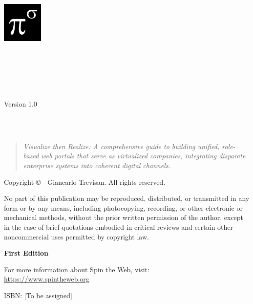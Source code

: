 \begin{titlepage}
\centering

\includegraphics[width=0.15\textwidth]{figures/logo.png}\\[1cm]

\vspace*{1cm}

\makeatletter
{\Huge\bfseries \@title\\[0.5cm]}

\ifx\@subtitle\@empty\else
{\Large \@subtitle\\[1.5cm]}
\fi

{\large\textsc{\@author}\\[2cm]}

{\large Version 1.0\\[0.5cm]}
{\large \@date\\[2cm]}
\makeatother

\vfill

{\large \organization\\[0.5cm]}

\begin{quote}
\centering
\textit{Visualize then Realize: A comprehensive guide to building unified, role-based web portals that serve as virtualized companies, integrating disparate enterprise systems into coherent digital channels.}
\end{quote}

\end{titlepage}

\thispagestyle{empty}
\null\vfill
\noindent
\thispagestyle{empty}
\vspace*{\fill}
\begin{center}
\small
Copyright \copyright\ \the\year\ Giancarlo Trevisan. All rights reserved.

\medskip

\noindent
No part of this publication may be reproduced, distributed, or transmitted in any form or by any means, including photocopying, recording, or other electronic or mechanical methods, without the prior written permission of the author, except in the case of brief quotations embodied in critical reviews and certain other noncommercial uses permitted by copyright law.

\medskip

\noindent
\textbf{First Edition}

\medskip

\noindent
For more information about Spin the Web, visit: \\
\url{https://www.spintheweb.org}

\medskip

\noindent
ISBN: [To be assigned]
\end{center}

\clearpage
